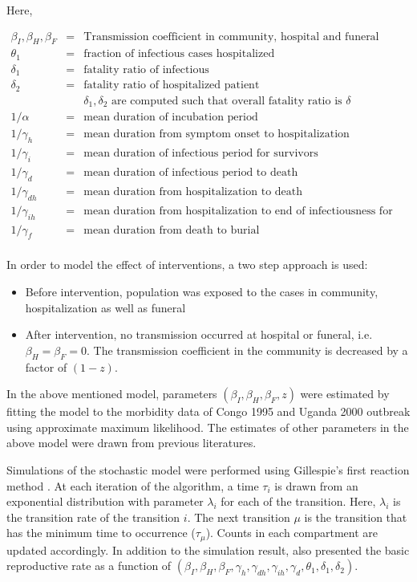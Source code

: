 \documentclass[10pt, journal,onecolumn]{IEEEtran}
\begin{document}
Here,

\begin{eqnarray*}
\beta_I, \beta_H, \beta_F &=& \text{Transmission coefficient in community, hospital and funeral respectively}\\
\theta_1 &=& \text{fraction of infectious cases hospitalized}\\
\delta_1 &=& \text{fatality ratio of infectious}\\
\delta_2 &=& \text{fatality ratio of hospitalized patient}\\
&& \delta_1, \delta_2 \text{ are computed such that overall fatality ratio is $\delta$}\\
1/\alpha &=& \text{mean duration of incubation period}\\
1/\gamma_h &=& \text{mean duration from symptom onset to hospitalization}\\
1/\gamma_{i} &=& \text{mean duration of infectious period for survivors}\\
1/\gamma_{d} &=& \text{mean duration of infectious period to death}\\
1/\gamma_{dh} &=& \text{mean duration from hospitalization to death}\\
1/\gamma_{ih} &=& \text{mean duration from hospitalization to end of infectiousness for survivors}\\
1/\gamma_{f} &=& \text{mean duration from death to burial}\\
\end{eqnarray*}

In order to model the effect of interventions, a two step approach is used:

\begin{itemize}
\item Before intervention, population was exposed to the cases in community, hospitalization as well as funeral
\item After intervention, no transmission occurred at hospital or funeral, i.e. $\beta_H = \beta_F = 0$. The transmission coefficient in the community is decreased by a factor of $(1-z)$.
\end{itemize}

In the above mentioned model, parameters $(\beta_I, \beta_H, \beta_F , z)$ were estimated by fitting the model to the morbidity data of Congo 1995 and Uganda 2000 outbreak using approximate maximum likelihood. The estimates of other parameters in the above model were drawn from previous literatures.

Simulations of the stochastic model were performed using Gillespie's first reaction method \citep{gillespie1976general}. At each iteration of the algorithm, a time $\tau_i$ is drawn from an exponential distribution with parameter $\lambda_i$ for each of the transition. Here, $\lambda_i$ is the transition rate of the transition $i$. The next transition $\mu$ is the transition that has the minimum time to occurrence ($\tau_\mu$). Counts in each compartment are updated accordingly. In addition to the simulation result,  \citep{legrand2007understanding} also presented the basic reproductive rate as a function of $(\beta_I,\beta_H,\beta_F,\gamma_h,\gamma_{dh},\gamma_{ih},\gamma_d,\theta_1,\delta_1,\delta_2)$.
\end{document}
